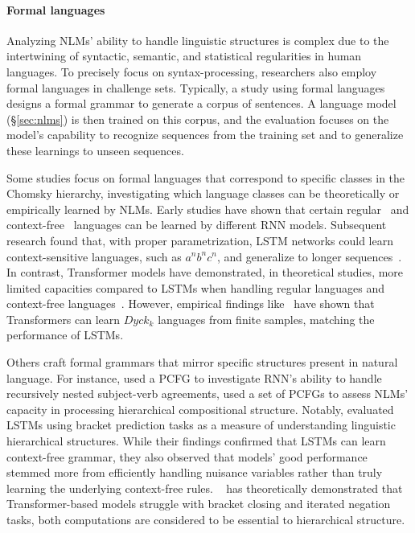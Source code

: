 \paragraph{Formal languages} Analyzing NLMs' ability to handle linguistic structures is complex due to the intertwining of syntactic, semantic, and statistical regularities in human languages. To precisely focus on syntax-processing, researchers also employ formal languages in challenge sets. Typically, a study using formal languages designs a formal grammar to generate a corpus of sentences. A language model (\S\ref{sec:nlms}) is then trained on this corpus, and the evaluation focuses on the model's capability to recognize sequences from the training set and to generalize these learnings to unseen sequences.

Some studies focus on formal languages that correspond to specific classes in the Chomsky hierarchy, investigating which language classes can be theoretically or empirically learned by NLMs. Early studies have shown that certain regular~\citep{giles1992learning} and context-free~\citep{elman89representation} languages can be learned by different RNN models. Subsequent research found that, with proper parametrization, LSTM networks could learn context-sensitive languages, such as $a^nb^nc^n$, and generalize to longer sequences~\citep{gers2001lstm,weiss2018practical,suzgun-etal-2019-lstm}. In contrast, Transformer models have demonstrated, in theoretical studies, more limited capacities compared to LSTMs when handling regular languages and context-free languages~\citep{bhattamishra-etal-2020-ability,hahn:2020}. However, empirical findings like~\citep{ebrahimi-etal-2020-self} have shown that Transformers can
learn $Dyck_k$ languages from finite samples, matching the performance of LSTMs. 

Others craft formal grammars that mirror specific structures present in natural language. For instance, \cite{lakretz2021can} used a \ac{PCFG} to investigate RNN's ability to handle recursively nested subject-verb agreements, \cite{hupkes2020compositionality} used a set of PCFGs to assess NLMs' capacity in processing hierarchical compositional structure. Notably, \cite{sennhauser-berwick-2018-evaluating} evaluated LSTMs using bracket prediction tasks as a measure of understanding linguistic hierarchical structures.  While their findings confirmed that LSTMs can learn context-free grammar, they also observed that models' good performance stemmed more from efficiently handling nuisance variables rather than truly learning the underlying context-free rules. ~\cite{hahn:2020} has theoretically demonstrated that Transformer-based models struggle with bracket closing and iterated negation tasks, both computations are
considered to be essential to hierarchical structure.

